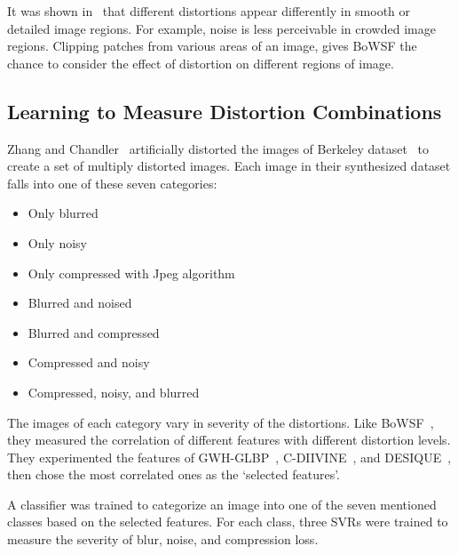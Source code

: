 It was shown in~\cite{Legge1980} that different distortions appear differently in smooth or detailed image regions. For example, noise is less perceivable in crowded image regions. Clipping patches from various areas of an image, gives BoWSF the chance to consider the effect of distortion on different regions of image.
\subsection{Learning to Measure Distortion Combinations}
Zhang and Chandler~\cite{Zhang2018} artificially distorted the images of Berkeley dataset~\cite{Martin2001} to create a set of multiply distorted images. Each image in their synthesized dataset falls into one of these seven categories:
\begin{itemize}
    \item Only blurred
    \item Only noisy
    \item Only compressed with Jpeg algorithm
    \item Blurred and noised
    \item Blurred and compressed
    \item Compressed and noisy
    \item Compressed, noisy, and blurred
\end{itemize}
The images of each category vary in severity of the distortions. Like BoWSF~\cite{lu2015no}, they measured the correlation of different features with different distortion levels. They experimented the features of GWH-GLBP~\cite{Li2016}, C-DIIVINE~\cite{Zhang2014cdiivine}, and DESIQUE~\cite{Zhang2013desique}, then chose the most correlated ones as the `selected features'. 

A classifier was trained to categorize an image into one of the seven mentioned classes based on the selected features. For each class, three SVRs were trained to measure the severity of blur, noise, and compression loss.

